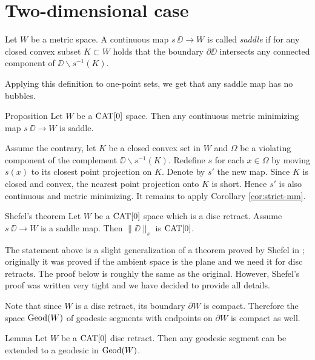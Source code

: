 \documentclass[a4paper,10pt]{amsart}
\begin{document}
\section{Two-dimensional case}

Let $W$ be a metric space.
A continuous map $s\:\DD\to W$ is called \emph{saddle} if for any closed convex subset $K\subset W$ holds that
the boundary $\partial \DD$ intersects
any connected component of $\DD\backslash s^{-1}(K)$.

Applying this definition to one-point sets,
we get that any saddle map has no bubbles.


\begin{thm}{Proposition}\label{prop:memisaddle}
Let $W$ be a $\mathop{\rm CAT}\nolimits[0]$ space. Then any continuous metric minimizing map $s\:\DD\to W$ is saddle.
\end{thm}

Assume the contrary, let $K$ be a closed convex set in $W$
and $\Omega$ be a violating component of the complement $\DD\backslash s^{-1}(K)$. 
Redefine $s$ for each $x\in\Omega$ by moving 
$s(x)$ to its closest point projection on $K$.
Denote by $s'$ the new map. Since $K$ is closed and convex, the nearest point projection onto $K$ is short.
Hence $s'$ is also continuous and metric minimizing. It remains to apply Corollary \ref{cor:strict-mm}.
\qeds

 






\begin{thm}{Shefel's theorem}\label{thm:shefel-2D}
Let $W$ be a $\mathop{\rm CAT}\nolimits[0]$ space which is a disc retract.
Assume $s\:\DD\to W$ is a saddle map. 
Then $\|\DD\|_s$ is $\mathop{\rm CAT}\nolimits[0]$.
\end{thm}

The statement above is a slight generalization of a theorem proved by Shefel in \cite{shefel-2D};
originally it was proved if the ambient space is the plane and we need it for disc retracts.
The proof below is roughly the same as the original.
However, Shefel's proof was written very tight
and we have decided to provide all details.


Note that since $W$ is a disc retract, its boundary $\partial W$ is compact. Therefore
the space $\mathop{\rm Geod}\nolimits(W)$ of geodesic segments with endpoints on $\partial W$ is compact as well.

\begin{thm}{Lemma}\label{lem:extension}
Let $W$ be a $\mathop{\rm CAT}\nolimits[0]$  disc retract. Then any geodesic segment can be extended to a geodesic in $\mathop{\rm Geod}\nolimits(W)$.
\end{thm}
\end{document}
